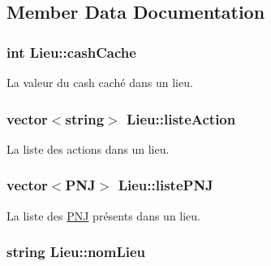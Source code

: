 \subsection{Member Data Documentation}
\hypertarget{class_lieu_a90b76b521f92a43626ccd29ed5a29f89}{
\subsubsection[{cash\-Cache}]{\setlength{\rightskip}{0pt plus 5cm}int Lieu\-::cash\-Cache\hspace{0.3cm}{\ttfamily [protected]}}}\label{class_lieu_a90b76b521f92a43626ccd29ed5a29f89}


La valeur du cash caché dans un lieu. 

\hypertarget{class_lieu_aeb5471a9b471cea9bfc5c5b9a03e5d0a}{
\subsubsection[{liste\-Action}]{\setlength{\rightskip}{0pt plus 5cm}vector$<$string$>$ Lieu\-::liste\-Action\hspace{0.3cm}{\ttfamily [protected]}}}\label{class_lieu_aeb5471a9b471cea9bfc5c5b9a03e5d0a}


La liste des actions dans un lieu. 

\hypertarget{class_lieu_a8c1e20b105f7972f22d8f16651de4ebd}{
\subsubsection[{liste\-P\-N\-J}]{\setlength{\rightskip}{0pt plus 5cm}vector$<${\bf P\-N\-J}$>$ Lieu\-::liste\-P\-N\-J\hspace{0.3cm}{\ttfamily [protected]}}}\label{class_lieu_a8c1e20b105f7972f22d8f16651de4ebd}


La liste des \hyperlink{class_p_n_j}{P\-N\-J} présents dans un lieu. 

\hypertarget{class_lieu_a1e48889fe5c581f043b8bd77ca497fc7}{
\subsubsection[{nom\-Lieu}]{\setlength{\rightskip}{0pt plus 5cm}string Lieu\-::nom\-Lieu\hspace{0.3cm}{\ttfamily [protected]}}}\label{class_lieu_a1e48889fe5c581f043b8bd77ca497fc7}



